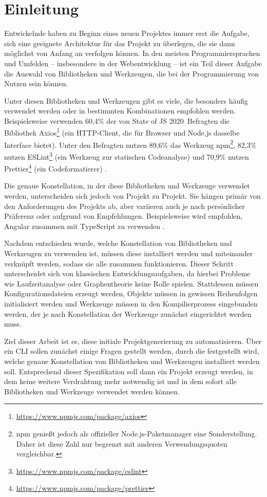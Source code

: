 \section{Einleitung}
Entwickelnde haben zu Beginn eines neuen Projektes immer erst die Aufgabe, sich eine geeignete Architektur für das Projekt zu überlegen, die sie dann möglichst von Anfang an verfolgen können. In den meisten Programmiersprachen und Umfelden -- insbesondere in der Webentwicklung -- ist ein Teil dieser Aufgabe die Auswahl von Bibliotheken und Werkzeugen, die bei der Programmierung von Nutzen sein können.

Unter diesen Bibliotheken und Werkzeugen gibt es viele, die besonders häufig verwendet werden oder in bestimmten Kombinationen empfohlen werden. Beispielsweise verwenden 60,4\% der von \glqq State of JS 2020\grqq\ Befragten die Bibliothek Axios\footnote{\url{https://www.npmjs.com/package/axios}} (ein HTTP-Client, die für Browser und Node.js dasselbe Interface bietet). Unter den Befragten nutzen 89,6\% das Werkzeug \gls{npm}\footnote{\gls{npm} genießt jedoch als offizieller Node.js-Paketmanager eine Sonderstellung. Daher ist diese Zahl nur begrenzt mit anderen Verwendungsquoten vergleichbar.}, 82,3\% nutzen ESLint\footnote{\url{https://www.npmjs.com/package/eslint}} (ein Werkzeug zur statischen Codeanalyse) und 70,9\% nutzen Prettier\footnote{\url{https://www.npmjs.com/package/prettier}} (ein Codeformatierer) \cite{stateofjs}.

Die genaue Konstellation, in der diese Bibliotheken und Werkzeuge verwendet werden, unterscheiden sich jedoch von Projekt zu Projekt. Sie hängen primär von den Anforderungen des Projekts ab, aber variieren auch je nach persönlicher Präferenz oder aufgrund von Empfehlungen. Beispielsweise wird empfohlen, Angular zusammen mit TypeScript zu verwenden \cite{angular_only_with_typescript}.

Nachdem entschieden wurde, welche Konstellation von Bibliotheken und Werkzeugen zu verwenden ist, müssen diese installiert werden und miteinander verknüpft werden, sodass sie alle zusammen funktionieren. Dieser Schritt unterscheidet sich von klassischen Entwicklungsaufgaben, da hierbei Probleme wie Laufzeitanalyse oder Graphentheorie keine Rolle spielen. Stattdessen müssen Konfigurationsdateien erzeugt werden, Objekte müssen in gewissen Reihenfolgen initialisiert werden und Werkzeuge müssen in den Kompilierprozess eingebunden werden, der je nach Konstellation der Werkzeuge zunächst eingerichtet werden muss.

Ziel dieser Arbeit ist es, diese initiale Projektgenerierung zu automatisieren. Über ein \gls{CLI} sollen zunächst einige Fragen gestellt werden, durch die festgestellt wird, welche genaue Konstellation von Bibliotheken und Werkzeugen installiert werden soll. Entsprechend dieser Spezifikation soll dann ein Projekt erzeugt werden, in dem keine weitere Verdrahtung mehr notwendig ist und in dem sofort alle Bibliotheken und Werkzeuge verwendet werden können.

